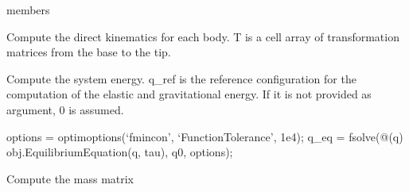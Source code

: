 \documentclass[letterpaper,10pt,english]{sphinxmanual}
\begin{document}
\begin{fulllineitems}
\begin{sphinxuseclass}{members}
\begin{description}
\begin{fulllineitems}
\end{fulllineitems}


\begin{fulllineitems}
\label{\detokenize{bodytree:BodyTree.DirectKinematics}}
\pysigstartsignatures
{}
\pysigstopsignatures
\sphinxAtStartPar
Compute the direct kinematics for each body.
T is a cell array of transformation matrices from the base to the tip.

\end{fulllineitems}


\begin{fulllineitems}
\label{\detokenize{bodytree:BodyTree.Energy}}
\pysigstartsignatures
{}
\pysigstopsignatures
\sphinxAtStartPar
Compute the system energy.
q\_ref is the reference configuration for the computation of
the elastic and gravitational energy. If it is not provided as
argument, 0 is assumed.

\end{fulllineitems}


\begin{fulllineitems}
\label{\detokenize{bodytree:BodyTree.EquilibriumConfiguration}}
\pysigstartsignatures
{}
\pysigstopsignatures
\sphinxAtStartPar
options = optimoptions(‘fmincon’, ‘FunctionTolerance’, 1e\sphinxhyphen{}4);
q\_eq = fsolve(@(q) obj.EquilibriumEquation(q, tau), q0, options);

\end{fulllineitems}


\begin{fulllineitems}
\label{\detokenize{bodytree:BodyTree.ForwardDynamics}}
\pysigstartsignatures
{}
\pysigstopsignatures
\sphinxAtStartPar
Compute the mass matrix


\end{fulllineitems}
\end{description}
\end{sphinxuseclass}
\end{fulllineitems}
\end{document}
